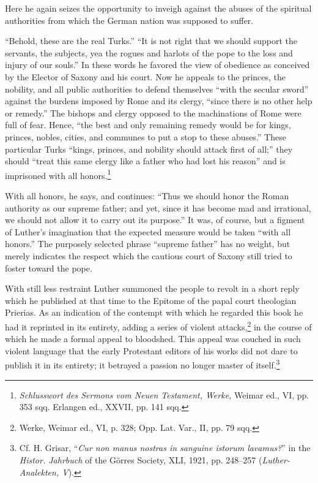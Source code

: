 Here he again seizes the opportunity to inveigh against the abuses
of the spiritual authorities from which the German nation was supposed
to suffer.

“Behold, these are the real Turks.” “It is not right that we should support
the servants, the subjects, yea the rogues and harlots of the pope to the loss
and injury of our souls.” In these words he favored the view of obedience
as conceived by the Elector of Saxony and his court. Now he appeals to the
princes, the nobility, and all public authorities to defend themselves “with
the secular sword” against the burdens imposed by Rome and its clergy,
“since there is no other help or remedy.” The bishops and clergy opposed to
the machinations of Rome were full of fear. Hence, “the best and only
remaining remedy would be for kings, princes, nobles, cities, and communes
to put a stop to these abuses.” These particular Turks “kings, princes,
and nobility should attack first of all;” they should “treat this same clergy
like a father who had lost his reason” and is imprisoned with all honors.\footnote
{\textit{Schlusswort des Sermons vom Neuen Testament, Werke,} Weimar ed., VI, pp. 353 sqq.
Erlangen ed., XXVII, pp. 141 sqq.}

With all honors, he says, and continues: “Thus we should honor the Roman
authority as our supreme father; and yet, since it has become mad and
irrational, we should not allow it to carry out its purpose.” It was, of
course, but a figment of Luther’s imagination that the expected measure
would be taken “with all honors.” The purposely selected phrase “supreme
father” has no weight, but merely indicates the respect which the cautious
court of Saxony still tried to foster toward the pope.

With still less restraint Luther summoned the people to revolt in a
short reply which he published at that time to the Epitome of the
papal court theologian Prierias. As an indication of the contempt
with which he regarded this book he had it reprinted in its entirety,
adding a series of violent attacks,\footnote{Werke, Weimar ed., VI, p. 328; Opp. Lat. Var., II, pp. 79 sqq.}
in the course of which he made
a formal appeal to bloodshed. This appeal was couched in such violent
language that the early Protestant editors of his works did not dare
to publish it in its entirety; it betrayed a passion no longer master of
itself.\footnote
{Cf. H. Grisar, ``\textit{Cur non manus nostras in sanguine istorum lavamus?}'' in the \textit{Histor.
Jahrbuch} of the Görres Society, XLI, 1921, pp. 248--257 (\textit{Luther-Analekten, V}).}

